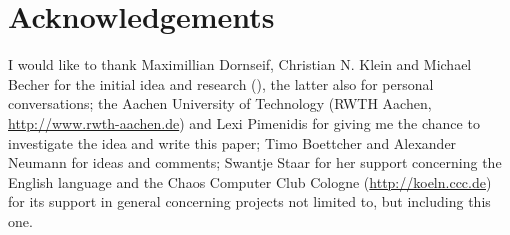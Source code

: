 %
%

\section{Acknowledgements}

I would like to thank Maximillian Dornseif, Christian N. Klein and Michael
Becher for the initial idea and research (\cite{cansecwest_firewire:2005}), the
latter also for personal conversations; the Aachen University of Technology
(RWTH Aachen, \href{http://www.rwth-aachen.de}{http://www.rwth-aachen.de}) and
Lexi Pimenidis for giving me the chance to investigate the idea and write this
paper; Timo Boettcher and Alexander Neumann for ideas and comments; Swantje
Staar for her support concerning the English language and the Chaos Computer
Club Cologne (\href{http://koeln.ccc.de}{http://koeln.ccc.de}) for its support
in general concerning projects not limited to, but including this one.

